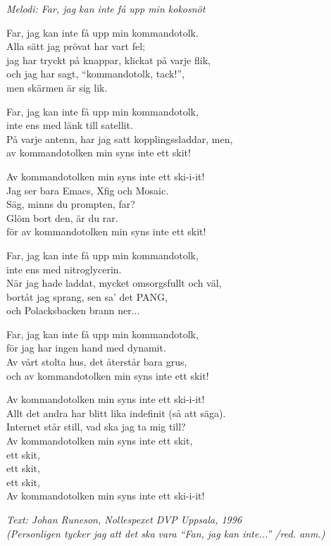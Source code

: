 {\footnotesize\textit{Melodi: Far, jag kan inte få upp min kokosnöt}}\par
\vspace{10pt}
Far, jag kan inte få upp min kommandotolk.\\
Alla sätt jag prövat har vart fel;\\
jag har tryckt på knappar, klickat på varje flik,\\
och jag har sagt, “kommandotolk, tack!”,\\
men skärmen är sig lik.\par
\vspace{10pt}
Far, jag kan inte få upp min kommandotolk,\\
inte ens med länk till satellit.\\
På varje antenn, har jag satt kopplingssladdar, men,\\
av kommandotolken min syns inte ett skit!\par
\vspace{10pt}
Av kommandotolken min syns inte ett ski-i-it!\\
Jag ser bara Emacs, Xfig och Mosaic.\\
Säg, minns du prompten, far?\\
Glöm bort den, är du rar.\\
för av kommandotolken min syns inte ett skit!\par
\vspace{10pt}
Far, jag kan inte få upp min kommandotolk,\\
inte ens med nitroglycerin.\\
När jag hade laddat, mycket omsorgsfullt och väl,\\
bortåt jag sprang, sen sa' det PANG,\\
och Polacksbacken brann ner...\par
\vspace{10pt}
Far, jag kan inte få upp min kommandotolk,\\
för jag har ingen hand med dynamit.\\
Av vårt stolta hus, det återstår bara grus,\\
och av kommandotolken min syns inte ett skit!\par
\vspace{10pt}
Av kommandotolken min syns inte ett ski-i-it!\\
Allt det andra har blitt lika indefinit (så att säga).\\
Internet står still, vad ska jag ta mig till?\\
Av kommandotolken min syns inte ett skit,\\
ett skit,\\
ett skit,\\
ett skit,\\
Av kommandotolken min syns inte ett ski-i-it!\par
\vspace{10pt}
{\footnotesize\textit{Text: Johan Runeson, Nollespexet DVP Uppsala,
    1996\\ (Personligen tycker jag att det ska vara ``Fan, jag kan
    inte...'' /red. anm.)}}
